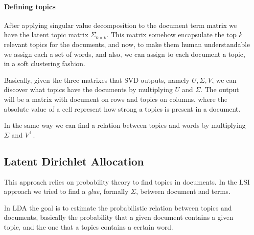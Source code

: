 \paragraph{Defining topics}
After applying singular value decomposition 
to the document term matrix we have the latent topic matrix
$\Sigma_{k \times k}$.
This matrix somehow encapsulate the top $k$ relevant topics for 
the documents, and now, to make them human understandable 
we assign each a set of words, and also, we can assign to each 
document a topic, in a soft clustering fashion.

Basically, given the three matrixes that SVD outputs, 
namely $U, \Sigma, V$, 
we can discover what topics have the documents by multiplying 
$U$ and $\Sigma$. The output will be a matrix with document 
on rows and topics on columns, where the absolute value of 
a cell represent how strong a topics is present in a document.

In the same way we can find a relation between topics and words 
by multiplying $\Sigma$ and $V^\top$.

\subsection{Latent Dirichlet Allocation}
This approach relies on probability theory to find topics
in documents. 
In the LSI approach we tried to find a \emph{glue}, formally $\Sigma$,
between document and terms.

In LDA the goal is to estimate the probabilistic relation 
between topics and documents, basically the probability that 
a given document contains a given topic, and the one that 
a topics contains a certain word.